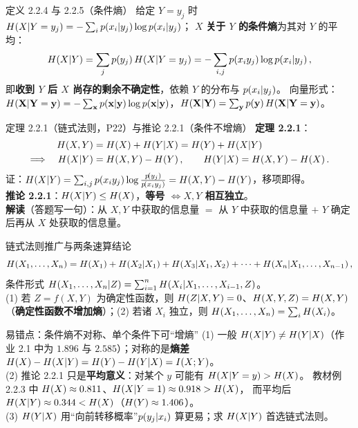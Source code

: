 \begin{defbox}{定义 2.2.4 与 2.2.5（条件熵）}
给定 $Y=y_j$ 时 $H\!\left(X|Y=y_j\right)=-\sum_ip\!\left(x_i|y_j\right)\log p\!\left(x_i|y_j\right)$；
$X$ \textbf{关于 $Y$ 的条件熵}为其对 $Y$ 的平均：
\[
H\!\left(X|Y\right)=\sum_{j}p\!\left(y_j\right)H\!\left(X|Y=y_j\right)=-\sum_{i,j}p\!\left(x_iy_j\right)\log p\!\left(x_i|y_j\right),
\]
即\textbf{收到 $Y$ 后 $X$ 尚存的剩余不确定性}，依赖 $Y$ 的分布与 $p\!\left(x_i|y_j\right)$。
向量形式：$H\!\left(\mathbf{X}|\mathbf{Y}=\mathbf{y}\right)=-\sum_{\mathbf{x}}p\!\left(\mathbf{x}|\mathbf{y}\right)
\log p\!\left(\mathbf{x}|\mathbf{y}\right)$，$H\!\left(\mathbf{X}|\mathbf{Y}\right)=\sum_{\mathbf{y}}p\!\left(\mathbf{y}\right)
H\!\left(\mathbf{X}|\mathbf{Y}=\mathbf{y}\right)$。
\end{defbox}

\begin{thmbox}{定理 2.2.1（链式法则，P22）与推论 2.2.1（条件不增熵）}
\textbf{定理 2.2.1}：
\begin{align*}
\Hx{X,Y}&=\Hx{X}+\Hx{Y|X}=\Hx{Y}+\Hx{X|Y}\\
\Longrightarrow\quad
\Hx{X|Y}&=\Hx{X,Y}-\Hx{Y},\qquad \Hx{Y|X}=\Hx{X,Y}-\Hx{X}.
\end{align*}
证：$H\!\left(X|Y\right)=\sum_{i,j}p\!\left(x_iy_j\right)\log\frac{p\!\left(y_j\right)}{p\!\left(x_iy_j\right)}=H\!\left(X,Y\right)-H\!\left(Y\right)$，移项即得。\\
\textbf{推论 2.2.1}：$H\!\left(X|Y\right)\le H\!\left(X\right)$，\textbf{等号 $\iff X,Y$ 相互独立}。\\
\textbf{解读}（答题写一句）：从 $X,Y$ 中获取的信息量 $=$ 从 $Y$ 中获取的信息量 $+$
$Y$ 确定后再从 $X$ 处获取的信息量。
\end{thmbox}

\begin{keypoint}{链式法则推广与两条速算结论}
\[
H\!\left(X_1,\dots,X_n\right)=H\!\left(X_1\right)+H\!\left(X_2|X_1\right)+H\!\left(X_3|X_1,X_2\right)+\cdots+H\!\left(X_n|X_1,\dots,X_{n-1}\right),
\]
条件形式 $H\!\left(X_1,\dots,X_n|Z\right)=\sum_{i=1}^{n}H\!\left(X_i|X_1,\dots,X_{i-1},Z\right)$。\\
(1) 若 $Z=f(X,Y)$ 为确定性函数，则 $H\!\left(Z|X,Y\right)=0$、$H\!\left(X,Y,Z\right)=H\!\left(X,Y\right)$
（\textbf{确定性函数不增加熵}）；(2) 若诸 $X_i$ 独立，则 $H\!\left(X_1,\dots,X_n\right)=\sum_iH\!\left(X_i\right)$。
\end{keypoint}

\begin{warning}{易错点：条件熵不对称、单个条件下可“增熵”}
(1) 一般 $H\!\left(X|Y\right)\neq H\!\left(Y|X\right)$（作业 2.1 中为 $1.896$ 与 $2.585$）；对称的是\textbf{熵差}
$H\!\left(X\right)-H\!\left(X|Y\right)=H\!\left(Y\right)-H\!\left(Y|X\right)=I\!\left(X;Y\right)$。\\
(2) 推论 2.2.1 只是\textbf{平均意义}：对某个 $y$ 可能有 $H\!\left(X|Y=y\right)>H\!\left(X\right)$。
教材例 2.2.3 中 $H\!\left(X\right)\approx0.811$、$H\!\left(X|Y=1\right)\approx0.918>H\!\left(X\right)$，
而平均后 $H\!\left(X|Y\right)\approx0.344<H\!\left(X\right)$（$H\!\left(Y\right)\approx1.406$）。\\
(3) $H\!\left(Y|X\right)$ 用“向前转移概率”$p\!\left(y_j|x_i\right)$ 算更易；求 $H\!\left(X|Y\right)$ 首选链式法则。
\end{warning}

